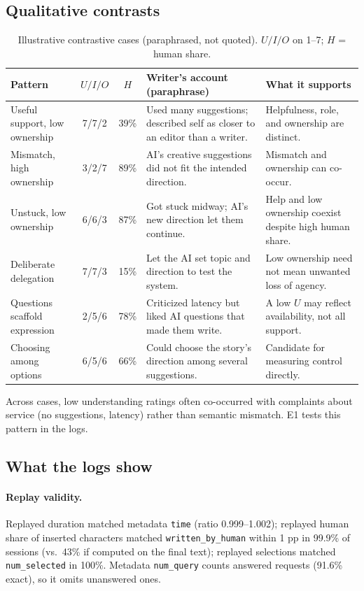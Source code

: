 \documentclass[10pt]{article}
\begin{document}
\subsection{Qualitative contrasts}
\begin{table}[h]
\centering\small
\caption{Illustrative contrastive cases (paraphrased, not quoted). $U/I/O$ on 1--7; $H$ = human share.}\label{tab:qual}
\begin{tabularx}{\linewidth}{@{}l c c X X@{}}
\toprule
Pattern & $U/I/O$ & $H$ & Writer's account (paraphrase) & What it supports \\
\midrule
Useful support, low ownership & 7/7/2 & 39\% & Used many suggestions; described self as closer to an editor than a writer. & Helpfulness, role, and ownership are distinct. \\
Mismatch, high ownership & 3/2/7 & 89\% & AI's creative suggestions did not fit the intended direction. & Mismatch and ownership can co-occur. \\
Unstuck, low ownership & 6/6/3 & 87\% & Got stuck midway; AI's new direction let them continue. & Help and low ownership coexist despite high human share. \\
Deliberate delegation & 7/7/3 & 15\% & Let the AI set topic and direction to test the system. & Low ownership need not mean unwanted loss of agency. \\
Questions scaffold expression & 2/5/6 & 78\% & Criticized latency but liked AI questions that made them write. & A low $U$ may reflect availability, not all support. \\
Choosing among options & 6/5/6 & 66\% & Could choose the story's direction among several suggestions. & Candidate for measuring control directly. \\
\bottomrule
\end{tabularx}
\end{table}
Across cases, low understanding ratings often co-occurred with complaints about service (no suggestions, latency) rather than semantic mismatch. E1 tests this pattern in the logs.

\subsection{What the logs show}
\paragraph{Replay validity.} Replayed duration matched metadata \texttt{time} (ratio 0.999--1.002); replayed human share of inserted characters matched \texttt{written\_by\_human} within 1 pp in 99.9\% of sessions (vs.\ 43\% if computed on the final text); replayed selections matched \texttt{num\_selected} in 100\%. Metadata \texttt{num\_query} counts answered requests (91.6\% exact), so it omits unanswered ones.
\end{document}
